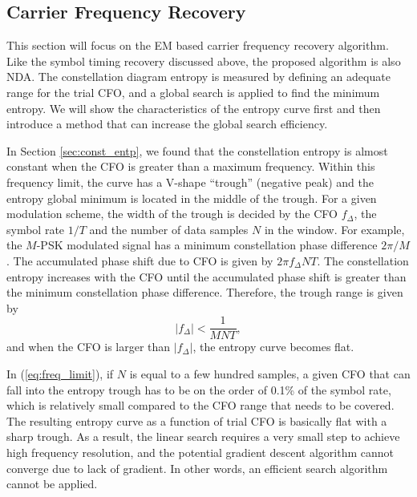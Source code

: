 \documentclass[journal,comsoc, onecolumn, 12pt,draftclsnofoot]{IEEEtran} %
\begin{document}
\subsection{Carrier Frequency Recovery}
This section will focus on the EM based carrier frequency recovery algorithm.
Like the symbol timing recovery discussed above, the proposed algorithm is also NDA.
The constellation diagram entropy is measured by defining an adequate range for the trial CFO, and a global search is applied to find the minimum entropy. 
We will show the characteristics of the entropy curve first and then introduce a method that can increase the global search efficiency. 

In Section \ref{sec:const_entp}, we found that the constellation entropy is almost constant when the CFO is greater than a maximum frequency.
Within this frequency limit, the curve has a V-shape ``trough'' (negative peak) and the entropy global minimum is located in the middle of the trough.
For a given modulation scheme, the width of the trough is decided by the CFO $f_\Delta$, the symbol rate $1/T$ and the number of data samples $N$ in the window.
For example, the \(M\)-PSK modulated signal has a minimum constellation phase difference \(2\pi/M\).
The accumulated phase shift due to CFO is given by \(2\pi f_\Delta N T\).
The constellation entropy increases with the CFO until the accumulated phase shift is greater than the minimum constellation phase difference. 
Therefore, the trough range is given by
\begin{equation}
\left| {f_\Delta } \right| < \frac{1}{{MNT}},
\label{eq:freq_limit}
\end{equation}
\noindent and when the CFO is larger than $\left| {f_\Delta } \right|$, the entropy curve becomes flat.


In (\ref{eq:freq_limit}), if \(N\) is equal to a few hundred samples, a given CFO that can fall into the entropy trough has to be on the order of 0.1\% of the symbol rate, which is relatively small compared to the CFO range that needs to be covered.
The resulting entropy curve as a function of trial CFO is basically flat with a sharp trough.
As a result, the linear search requires a very small step to achieve high frequency resolution, and the potential gradient descent algorithm cannot converge due to lack of gradient.
In other words, an efficient search algorithm cannot be applied. 
\end{document}
